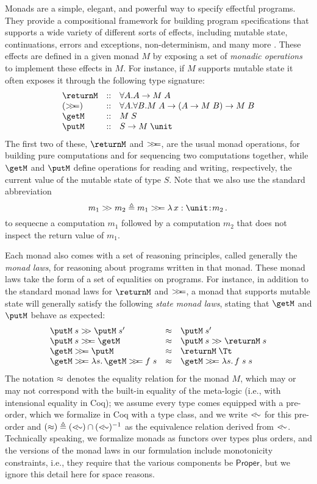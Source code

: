 \documentclass[preprint]{sigplanconf}
\begin{document}
Monads are a simple, elegant, and powerful way to specify effectful programs.
They provide a compositional framework for building program specifications that
supports a wide variety of different sorts of effects, including mutable state,
continuations, errors and exceptions, non-determinism, and many more
\cite{moggi91}.  These effects are defined in a given monad $M$ by exposing a
set of \emph{monadic operations} to implement these effects in $M$. For
instance, if $M$ supports mutable state it often exposes it through the
following type signature:
\[
\begin{array}{lcl}
  \returnM & :: & \forall A. A \to M\;A \\
  (\bind) & :: & \forall A. \forall B. M\;A \to (A\to M\;B) \to M\;B \\
  \getM & :: & M\;S \\
  \putM & :: & S \to M\;\unit
\end{array}
\]
The first two of these, $\returnM$ and $>\!\!>\!\!=$, are the usual monad operations,
for building pure computations and for sequencing two computations together,
while $\getM$ and $\putM$ define operations for reading and writing,
respectively, the current value of the mutable state of type $S$. Note that
we also use the standard abbreviation
\[
m_1 \bindU m_2 \triangleq m_1 \bind \lamabs{x:\unit}{m_2}
\]
to sequecne a computation $m_1$ followed by a computation $m_2$ that does not
inspect the return value of $m_1$.


Each monad also comes with a set of reasoning principles, called generally the
\emph{monad laws}, for reasoning about programs written in that monad. These
monad laws take the form of a set of equalities on programs. For instance, in
addition to the standard monad laws for $\returnM$ and $>\!\!>\!\!=$, a monad that
supports mutable state will generally satisfy the following \emph{state monad
  laws}, stating that $\getM$ and $\putM$ behave as expected:
\[
\begin{array}{lcl}
  \putM\;s \bindU \putM\;s' & \lreq & \putM\;s'\\
  \putM\;s \bind \getM & \lreq & \putM\;s \bindU \returnM\;s \\
  \getM\bind\putM & \lreq & \returnM\;\Tt \\
  \getM\bind \lamabsnot{s}{\getM\bind f\;s} & \lreq & \getM\bind\lamabsnot{s}{f\;s\;s}
\end{array}
\]
The notation $\approx$ denotes the equality relation for the monad $M$, which may
or may not correspond with the built-in equality of the meta-logic (i.e., with
intensional equality in Coq); we assume every type comes equipped with a
pre-order, which we formalize in Coq with a type class, and we write $<\!\!\sim$
for this pre-order and $(\approx)\triangleq(<\!\!\sim)\cap(<\!\!\sim)^{-1}$ as the
equivalence relation derived from $<\!\!\sim$. Technically speaking, we formalize
monads as functors over types plus orders, and the versions of the monad laws
in our formulation include monotonicity constraints, i.e., they require that
the various components be $\mathsf{Proper}$, but we ignore this detail here
for space reasons.
\end{document}
